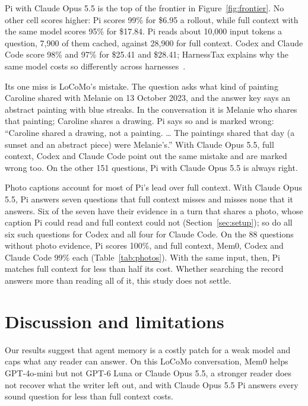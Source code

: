 \documentclass[11pt]{article}
\begin{document}
Pi with Claude Opus 5.5 is the top of the frontier in Figure~\ref{fig:frontier}. No other cell scores higher: Pi scores 99\% for \$6.95 a rollout, while full context with the same model scores 95\% for \$17.84. Pi reads about 10,000 input tokens a question, 7,900 of them cached, against 28,900 for full context. Codex and Claude Code score 98\% and 97\% for \$25.41 and \$28.41; HarnessTax explains why the same model costs so differently across harnesses~\citep{arena2026harnesstax}.

Its one miss is LoCoMo's mistake. The question asks what kind of painting Caroline shared with Melanie on 13 October 2023, and the answer key says an abstract painting with blue streaks. In the conversation it is Melanie who shares that painting; Caroline shares a drawing. Pi says so and is marked wrong: ``Caroline shared a drawing, not a painting. \ldots{} The paintings shared that day (a sunset and an abstract piece) were Melanie's.'' With Claude Opus 5.5, full context, Codex and Claude Code point out the same mistake and are marked wrong too. On the other 151 questions, Pi with Claude Opus 5.5 is always right.

Photo captions account for most of Pi's lead over full context. With Claude Opus 5.5, Pi answers seven questions that full context misses and misses none that it answers. Six of the seven have their evidence in a turn that shares a photo, whose caption Pi could read and full context could not (Section~\ref{sec:setup}); so do all six such questions for Codex and all four for Claude Code. On the 88 questions without photo evidence, Pi scores 100\%, and full context, Mem0, Codex and Claude Code 99\% each (Table~\ref{tab:photos}). With the same input, then, Pi matches full context for less than half its cost. Whether searching the record answers more than reading all of it, this study does not settle.

\section{Discussion and limitations}
\label{sec:discussion}

Our results suggest that agent memory is a costly patch for a weak model and caps what any reader can answer. On this LoCoMo conversation, Mem0 helps GPT-4o-mini but not GPT-6 Luna or Claude Opus 5.5, a stronger reader does not recover what the writer left out, and with Claude Opus 5.5 Pi answers every sound question for less than full context costs.
\end{document}
